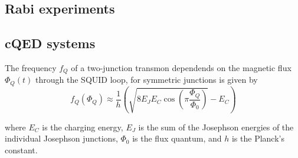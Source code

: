 \subsection{Rabi experiments}

\subsection{cQED systems} \label{sec:cQED}

The frequency $f_Q$ of a two-junction transmon dependends on the magnetic flux $\Phi_Q(t)$ through the SQUID loop, for symmetric junctions is given by\cite{TransmonPaper}
\begin{equation}\label{eq:freqdepndenceonflux}
    f_Q(\Phi_Q) \approx \frac{1}{h} \left( \sqrt{8E_J E_C \cos\left(\pi \frac{\Phi_Q}{\Phi_0} \right)} - E_C \right)    
\end{equation}

where $E_C$ is the charging energy, $E_J$ is the sum of the Josephson energies of the individual Josephson junctions, $\Phi_0$ is the flux quantum, and $h$ is the Planck's constant.